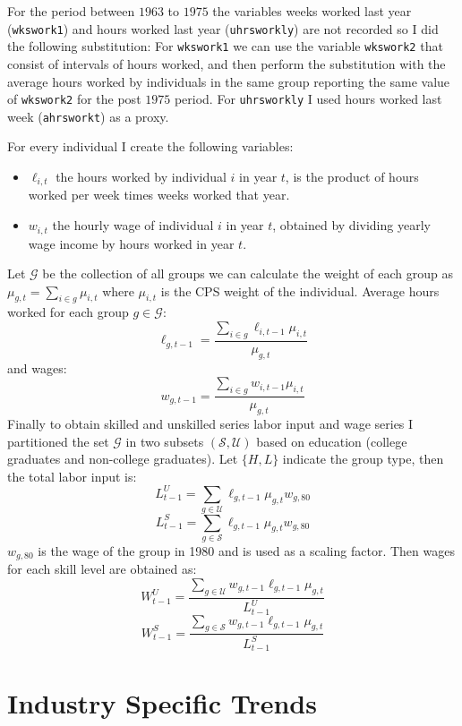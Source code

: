 \documentclass[12pt]{article}
\begin{document}
For the period between $1963$ to $1975$ the variables weeks worked last year (\texttt{wkswork1}) and hours worked last year (\texttt{uhrsworkly}) are not recorded so I did the following substitution: For \texttt{wkswork1} we can use the variable \texttt{wkswork2} that consist of intervals of hours worked, and then perform the substitution with the average hours worked by individuals in the same group reporting the same value of \texttt{wkswork2} for the post $1975$ period. For \texttt{uhrsworkly} I used hours worked last week (\texttt{ahrsworkt}) as a proxy.

For every individual I create the following variables:
\begin{itemize}
\item $\ell_{i,t}$ the hours worked by individual $i$ in year $t$, is the product of hours worked per week times weeks worked that year.
\item $w_{i,t}$ the hourly wage of individual $i$ in year $t$, obtained by dividing yearly wage income by hours worked in year $t$.
\end{itemize}

Let $\mathcal{G}$ be the collection of all groups we can calculate the weight of each group as $\mu_{g,t} = \sum_{i\in g} \mu_{i,t}$ where $ \mu_{i,t}$ is the CPS weight of the individual. Average hours worked for each group $g\in\mathcal{G}$: 
\[
\ell_{g, t-1} = \frac{\sum_{i\in g}\ell_{i,t-1} \mu_{i,t}}{\mu_{g, t}}
\]
and wages:
\[
w_{g, t-1} = \frac{\sum_{i\in g}w_{i,t-1} \mu_{i,t}}{\mu_{g, t}}
\]
Finally to obtain skilled and unskilled series labor input and wage series I partitioned the set $\mathcal{G}$ in two subsets $(\mathcal{S}, \mathcal{U})$ based on education (college graduates and non-college graduates). Let $\{H, L\}$ indicate the group type, then the total labor input is:
\[
 L^U_{t-1} = \sum_{g \in\mathcal{U}} \ell_{g, t-1} \mu_{g,t} w_{g,80}
\]
\[
 L^S_{t-1} = \sum_{g \in\mathcal{S}} \ell_{g, t-1} \mu_{g,t} w_{g,80}
\]
$w_{g,80}$ is the wage of the group in 1980 and is used as a scaling factor. Then wages for each skill level are obtained as:
\[
W^U_{t-1} = \frac{\sum_{g \in \mathcal{U}} w_{g, t-1} \ell_{g, t-1} \mu_{g,t}}{L^U_{t-1}}
\]
\[
W^S_{t-1} = \frac{\sum_{g \in \mathcal{S}} w_{g, t-1} \ell_{g, t-1} \mu_{g,t}}{L^S_{t-1}}
\]

\section{Industry Specific Trends}\label{sec:industry-specific-trends}
\end{document}
